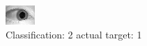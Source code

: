 \begin{figure}[h!]
\begin{center}
\includegraphics[width=0.60\columnwidth]{figures/ID1437_class_2_target_1.png}
\end{center}
\caption{ Classification: 2 actual target: 1}
\label{fig:ID1437_class_2_target_1}
\end{figure}

